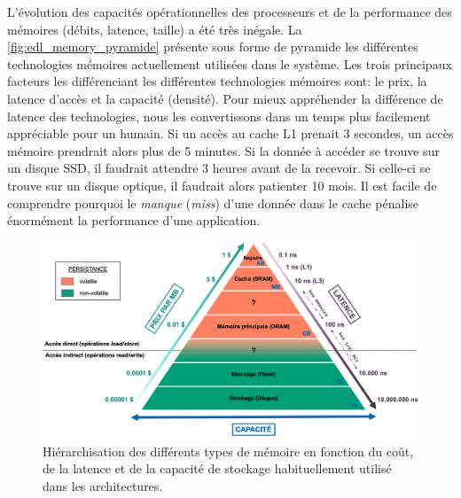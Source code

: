         L'évolution des capacités opérationnelles des processeurs et de la performance des mémoires (débits, latence, taille) a été très inégale. La \autoref{fig:edl_memory_pyramide} présente sous forme de pyramide les différentes technologies mémoires actuellement utilisées dans le système. Les trois principaux facteurs les différenciant les différentes technologies mémoires sont: le prix, la latence d'accès et la capacité (densité). Pour mieux appréhender la différence de latence des technologies, nous les convertissons dans un temps plus facilement appréciable pour un humain. Si un accès au cache L1 prenait 3 secondes, un accès mémoire prendrait alors plus de 5 minutes. Si la donnée à accéder se trouve sur un disque SSD, il faudrait attendre 3 heures avant de la recevoir. Si celle-ci se trouve sur un disque optique, il faudrait alors patienter 10 mois. Il est facile de comprendre pourquoi le \textit{manque} (\textit{miss}) d'une donnée dans le cache pénalise énormément la performance d'une application. 
        
        \begin{figure}
            \center
            \includegraphics[width=17cm]{images/edl_memory_pyramide.png}
            \caption{\label{fig:edl_memory_pyramide} Hiérarchisation des différents types de mémoire en fonction du coût, de la latence et de la capacité de stockage habituellement utilisé dans les architectures.}
        \end{figure}
        
